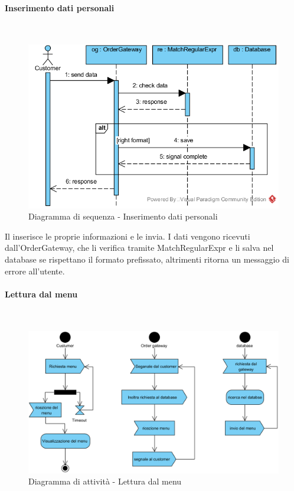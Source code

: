 \paragraph{Inserimento dati personali}\mbox{}\\
\nopagebreak
\begin{figure}[H]
	\centering
	\includegraphics[width=14cm]{diagrammi_img/sequenza/cliente_inserisci_informazioni.png}
	\caption{Diagramma di sequenza - Inserimento dati personali}
\end{figure}
Il \Customer{} inserisce le proprie informazioni e le invia. I dati vengono ricevuti dall'Order\-Gateway, che li verifica tramite MatchRegularExpr e li salva nel database se rispettano il formato prefissato, altrimenti ritorna un messaggio di errore all'utente.


\paragraph{Lettura dal menu}\mbox{}\\
\nopagebreak
\begin{figure}[H]
	\centering
	\includegraphics[width=14cm]{diagrammi_img/attivita/costumer_get_menu.png}
	\caption{Diagramma di attività - Lettura dal menu}
\end{figure}

